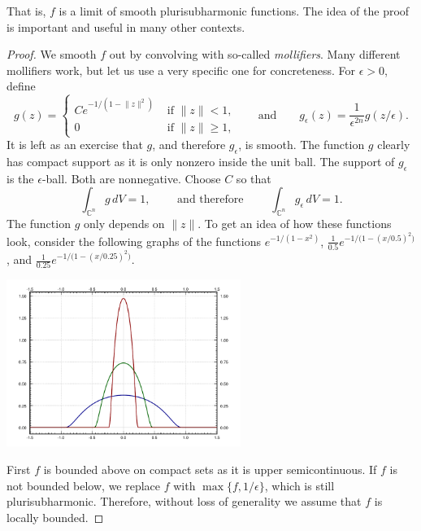 \documentclass[12pt,openany]{book}
\newcommand{\snorm}[1]{\lVert {#1} \rVert}
\newcommand{\C}{{\mathbb{C}}}
\theoremstyle{plain}
\theoremstyle{remark}
\theoremstyle{definition}
\theoremstyle{exercise}
\theoremstyle{example}
\begin{document}
That is, $f$ is a limit of smooth plurisubharmonic functions.
The idea of the proof is important and useful in many other
contexts.

\begin{proof}
We smooth $f$ out by convolving with so-called
\emph{mollifiers}.  Many different mollifiers 
work, but let us use a very specific one for concreteness.
For $\epsilon > 0$, define 
\begin{equation*}
g(z) = 
\begin{cases}
C e^{-1/(1-\snorm{z}^2)} & \text{ if $\snorm{z} < 1$,}
\\
0 & \text{ if $\snorm{z} \geq 1$,}
\end{cases}
\qquad
\text{and}
\qquad
g_\epsilon(z) = \frac{1}{\epsilon^{2n}} g(z/\epsilon) .
\end{equation*}
It is left as an exercise that $g$, and therefore $g_\epsilon$, is smooth.
The function $g$ clearly has compact
support as it is only nonzero inside the unit ball.  The support of
$g_\epsilon$ is the $\epsilon$-ball.  Both are nonnegative.  Choose $C$ so that
\begin{equation*}
\int_{\C^n} g\, dV = 1 ,
\qquad \text{ and therefore } \qquad
\int_{\C^n} g_\epsilon\, dV = 1 .
\end{equation*}
The function $g$ only depends on $\snorm{z}$.  To get an idea of
how these functions look, consider the following graphs of the
functions $e^{-1/(1-x^2)}$,
$\frac{1}{0.5}e^{-1/\bigl(1-{(x/0.5)}^2\bigr)}$, and
$\frac{1}{0.25}e^{-1/\bigl(1-{(x/0.25)}^2\bigr)}$.

\begin{center}
\includegraphics[width=3.0in]{graph-of-mollifier.pdf}
\end{center}

First $f$ is bounded above on compact sets as it is upper semicontinuous.
If $f$ is not bounded below, we replace $f$ with $\max \{ f , 1/\epsilon
\}$, which is still plurisubharmonic.  Therefore, without loss of generality
we assume that $f$ is locally bounded.


\end{proof}
\end{document}
